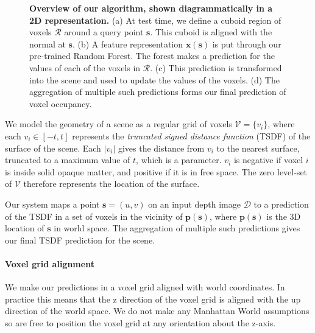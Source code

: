 \documentclass[10pt,twocolumn,letterpaper]{article}
\newcommand{\rgbdimage}{\mathcal{D}}
\newcommand{\pixelidx}{\mathbf{s}}
\newcommand{\voxelgrid}{\mathcal{V}}
\newcommand{\voxel}{v}
\newcommand{\voxidx}{i}
\newcommand{\project}{\mathbf{p}}
\begin{document}
\begin{figure}[tb]
    \caption{\textbf{Overview of our algorithm, shown diagrammatically in a 2D representation.} 
    (a) At test time, we define a cuboid region of voxels $\mathcal{R}$ around a query point $\pixelidx$.
    This cuboid is aligned with the normal at $\pixelidx$.
    (b) A feature representation $\mathbf{x}(\mathbf{s})$ is put through our pre-trained Random Forest.
    The forest makes a prediction for the values of each of the voxels in $\mathcal{R}$.
    (c) This prediction is transformed into the scene and used to update the values of the voxels.
    (d) The aggregation of multiple such predictions forms our final prediction of voxel occupancy.
    }%
    \label{fig:overview}
\end{figure}


We model the geometry of a scene as a regular grid of voxels $\voxelgrid = \{\voxel_\voxidx\}$, where each $\voxel_\voxidx \in [-t, t]$ represents the \emph{truncated signed distance function} (TSDF) of the surface of the scene. 
Each $|\voxel_\voxidx|$ gives the distance from $\voxel_\voxidx$ to the nearest surface, truncated to a maximum value of $t$, which is a parameter. 
$\voxel_\voxidx$ is negative if voxel $\voxidx$ is inside solid opaque matter, and positive if it is in free space. 
The zero level-set of $\voxelgrid$ therefore represents the location of the surface.

\newcommand{\voxregion}{\mathcal{R}}

Our system maps a point $\pixelidx = (u, v)$ on an input depth image $\rgbdimage$ to a prediction of the TSDF in a set of voxels in the vicinity of $\project(\pixelidx)$, where $\project(\pixelidx)$ is the 3D location of $\pixelidx$ in world space.
The aggregation of multiple such predictions gives our final TSDF prediction for the scene.

\paragraph{Voxel grid alignment}
We make our predictions in a voxel grid aligned with world coordinates.
In practice this means that the z direction of the voxel grid is aligned with the up direction of the world space.
We do not make any Manhattan World assumptions so are free to position the voxel grid at any orientation about the z-axis.
\end{document}
